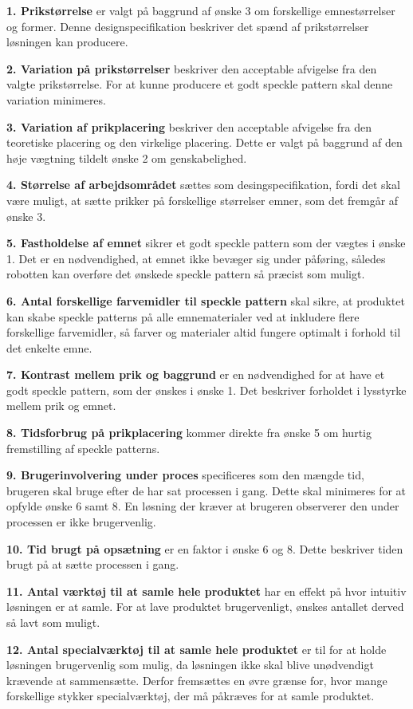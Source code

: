 \textbf{1. Prikstørrelse} er valgt på baggrund af ønske 3 om forskellige emnestørrelser og former. Denne designspecifikation beskriver det spænd af prikstørrelser løsningen kan producere. 

\textbf{2. Variation på prikstørrelser} beskriver den acceptable afvigelse fra den valgte prikstørrelse. For at kunne producere et godt speckle pattern skal denne variation minimeres.

\textbf{3. Variation af prikplacering} beskriver den acceptable afvigelse fra den teoretiske placering og den virkelige placering. Dette er valgt på baggrund af den høje vægtning tildelt ønske 2 om genskabelighed. 

\textbf{4. Størrelse af arbejdsområdet} sættes som desingspecifikation, fordi det skal være muligt, at sætte prikker på forskellige størrelser emner, som det fremgår af ønske 3. 

\textbf{5. Fastholdelse af emnet} sikrer et godt speckle pattern som der vægtes i ønske 1. Det er en nødvendighed, at emnet ikke bevæger sig under påføring, således robotten kan overføre det ønskede speckle pattern så præcist som muligt.

\textbf{6. Antal forskellige farvemidler til speckle pattern} skal sikre, at produktet kan skabe speckle patterns på alle emnematerialer ved at inkludere flere forskellige farvemidler, så farver og materialer altid fungere optimalt i forhold til det enkelte emne.

\textbf{7. Kontrast mellem prik og baggrund} er en nødvendighed for at have et godt speckle pattern, som der ønskes i ønske 1. Det beskriver forholdet i lysstyrke mellem prik og emnet.

\textbf{8. Tidsforbrug på prikplacering} kommer direkte fra ønske 5 om hurtig fremstilling af speckle patterns. 

\textbf{9. Brugerinvolvering under proces} specificeres som den mængde tid, brugeren skal bruge efter de har sat processen i gang. Dette skal minimeres for at opfylde ønske 6 samt 8. En løsning der kræver at brugeren observerer den under processen er ikke brugervenlig.
  
\textbf{10. Tid brugt på opsætning} er en faktor i ønske 6 og 8. Dette beskriver tiden brugt på at sætte processen i gang.

\textbf{11. Antal værktøj til at samle hele produktet} har en effekt på hvor intuitiv løsningen er at samle. For at lave produktet brugervenligt, ønskes antallet derved så lavt som muligt.

\textbf{12. Antal specialværktøj til at samle hele produktet} er til for at holde løsningen brugervenlig som mulig, da løsningen ikke skal blive unødvendigt krævende at sammensætte. Derfor fremsættes en øvre grænse for, hvor mange forskellige stykker specialværktøj, der må påkræves for at samle produktet.
